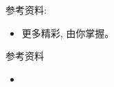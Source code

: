 \documentclass[a4paper, justified]{tufte-handout}
\begin{document}
\begin{solution}
\end{solution}

\beginoptional

\begin{problem}[]
\end{problem}

\begin{solution}
\end{solution}

\beginot

\begin{ot}[]

  \noindent 参考资料:
  \begin{itemize}
    \item 更多精彩, 由你掌握。
  \end{itemize}
\end{ot}

\begin{solution}
\end{solution}
\begin{ot}

  \noindent 参考资料
  \begin{itemize}
    \item 
  \end{itemize}
\end{ot}




\beginfb



\end{document}
